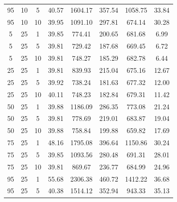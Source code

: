 \begin{table}[H]
\begin{tabular}{ccc|c|c|c|c|c}
95 & 10 & 5 & \cellcolor{gray!73}40.57 & \cellcolor{gray!1}1604.17 & \cellcolor{gray!1}357.54 & \cellcolor{gray!1}1058.75 & 33.84\\
95 & 10 & 10 & \cellcolor{gray!79}39.95 & \cellcolor{gray!20}1091.10 & \cellcolor{gray!1}297.81 & \cellcolor{gray!76}674.14 & 30.28\\
5 & 25 & 1 & \cellcolor{gray!80}39.85 & \cellcolor{gray!72}774.41 & \cellcolor{gray!58}200.65 & \cellcolor{gray!74}681.68 & 6.99\\
5 & 25 & 5 & \cellcolor{gray!80}39.81 & \cellcolor{gray!80}729.42 & \cellcolor{gray!70}187.68 & \cellcolor{gray!78}669.45 & 6.72\\
5 & 25 & 10 & \cellcolor{gray!80}39.81 & \cellcolor{gray!77}748.27 & \cellcolor{gray!72}185.29 & \cellcolor{gray!73}682.78 & 6.44\\
25 & 25 & 1 & \cellcolor{gray!80}39.81 & \cellcolor{gray!61}839.93 & \cellcolor{gray!45}215.04 & \cellcolor{gray!76}675.16 & 12.67\\
25 & 25 & 5 & \cellcolor{gray!79}39.92 & \cellcolor{gray!78}738.24 & \cellcolor{gray!76}181.63 & \cellcolor{gray!75}677.32 & 12.00\\
25 & 25 & 10 & \cellcolor{gray!78}40.11 & \cellcolor{gray!77}748.23 & \cellcolor{gray!75}182.84 & \cellcolor{gray!75}679.31 & 11.42\\
50 & 25 & 1 & \cellcolor{gray!80}39.88 & \cellcolor{gray!4}1186.09 & \cellcolor{gray!1}286.35 & \cellcolor{gray!46}773.08 & 21.24\\
50 & 25 & 5 & \cellcolor{gray!80}39.81 & \cellcolor{gray!72}778.69 & \cellcolor{gray!41}219.01 & \cellcolor{gray!73}683.87 & 19.04\\
50 & 25 & 10 & \cellcolor{gray!80}39.88 & \cellcolor{gray!75}758.84 & \cellcolor{gray!59}199.88 & \cellcolor{gray!80}659.82 & 17.69\\
75 & 25 & 1 & \cellcolor{gray!1}48.16 & \cellcolor{gray!1}1795.08 & \cellcolor{gray!1}396.64 & \cellcolor{gray!1}1150.86 & 30.24\\
75 & 25 & 5 & \cellcolor{gray!80}39.85 & \cellcolor{gray!19}1093.56 & \cellcolor{gray!1}280.48 & \cellcolor{gray!71}691.31 & 28.01\\
75 & 25 & 10 & \cellcolor{gray!80}39.81 & \cellcolor{gray!57}869.67 & \cellcolor{gray!24}236.77 & \cellcolor{gray!73}684.99 & 24.96\\
95 & 25 & 1 & \cellcolor{gray!1}55.68 & \cellcolor{gray!1}2306.38 & \cellcolor{gray!1}460.72 & \cellcolor{gray!1}1412.22 & 36.68\\
95 & 25 & 5 & \cellcolor{gray!75}40.38 & \cellcolor{gray!1}1514.12 & \cellcolor{gray!1}352.94 & \cellcolor{gray!1}943.33 & 35.13\\

\end{tabular}
\end{table}
